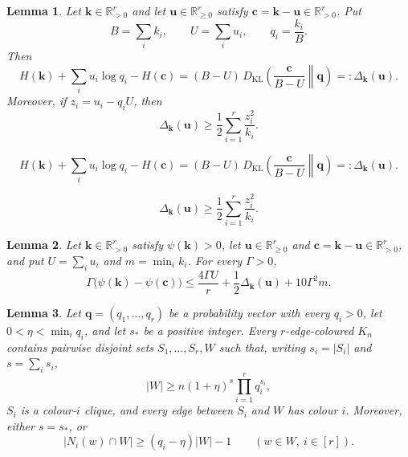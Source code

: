 \documentclass[10pt,a4paper]{amsart}
\newtheorem{lemma}{Lemma}
\newcommand{\DG}{\Delta}
\newcommand{\Ent}{H}
\newcommand{\KL}{D_{\mathrm{KL}}}
\newcommand{\R}{\mathbb R}
\newcommand{\cc}{\mathbf c}
\newcommand{\kk}{\mathbf k}
\newcommand{\pot}{\psi}
\newcommand{\qq}{\mathbf q}
\newcommand{\uu}{\mathbf u}
\begin{document}
\begin{lemma}\label{lem:entropy}
Let $\kk\in\R_{>0}^r$ and let $\uu\in\R_{\ge0}^r$ satisfy
$\cc=\kk-\uu\in\R_{>0}^r$.  Put
\[
 B=\sum_i k_i,\qquad U=\sum_i u_i,
 \qquad q_i=\frac{k_i}{B}.
\]
Then
\begin{equation}\label{eq:entropy-identity}
 \Ent(\kk)+\sum_i u_i\log q_i-\Ent(\cc)
 =(B-U)\,\KL\!\left(\frac{\cc}{B-U}\middle\|\qq\right)
 =:\DG_{\kk}(\uu).
\end{equation}
Moreover, if $z_i=u_i-q_iU$, then
\begin{equation}\label{eq:entropy-lower}
 \DG_{\kk}(\uu)\ge
 \frac12\sum_{i=1}^r\frac{z_i^2}{k_i}.
\end{equation}
\end{lemma}

\begin{equation}
 \Ent(\kk)+\sum_i u_i\log q_i-\Ent(\cc)
 =(B-U)\,\KL\!\left(\frac{\cc}{B-U}\middle\|\qq\right)
 =:\DG_{\kk}(\uu).
\end{equation}

\begin{equation}
 \DG_{\kk}(\uu)\ge
 \frac12\sum_{i=1}^r\frac{z_i^2}{k_i}.
\end{equation}

\begin{lemma}\label{lem:potential}
Let $\kk\in\R_{>0}^r$ satisfy $\pot(\kk)>0$, let
$\uu\in\R_{\ge0}^r$ and $\cc=\kk-\uu\in\R_{>0}^r$, and put
$U=\sum_i u_i$ and $m=\min_i k_i$.  For every $\Gamma>0$,
\[
 \Gamma\bigl(\pot(\kk)-\pot(\cc)\bigr)
 \le \frac{4\Gamma U}{r}
      +\frac12\DG_{\kk}(\uu)+10\Gamma^2m.
\]
\end{lemma}

\begin{lemma}\label{lem:weighted}
Let $\qq=(q_1,\ldots,q_r)$ be a probability vector with every $q_i>0$, let
$0<\eta<\min_iq_i$, and let $s_\ast$ be a positive integer.  Every
$r$-edge-coloured $K_n$ contains pairwise disjoint sets
$S_1,\ldots,S_r,W$ such that, writing $s_i=|S_i|$ and $s=\sum_i s_i$,
\begin{equation}\label{eq:weighted-size}
 |W|\ge n(1+\eta)^s\prod_{i=1}^r q_i^{s_i},
\end{equation}
$S_i$ is a colour-$i$ clique, and every edge between $S_i$ and $W$ has colour
$i$.  Moreover, either $s=s_\ast$, or
\begin{equation}\label{eq:weighted-degree}
 |N_i(w)\cap W|\ge(q_i-\eta)|W|-1
 \qquad(w\in W,\ i\in[r]).
\end{equation}
\end{lemma}
\end{document}
